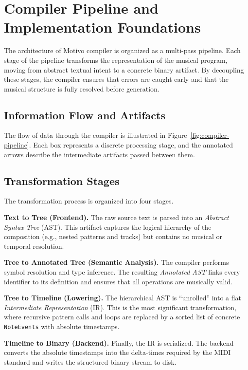 \section{Compiler Pipeline and Implementation Foundations}\label{sec:compiler-pipeline}

The architecture of Motivo compiler is organized as a multi-pass pipeline.
Each stage of the pipeline transforms the representation of the musical program, moving from abstract textual intent to
a concrete binary artifact.
By decoupling these stages, the compiler ensures that errors are caught early and that the musical structure is fully
resolved before generation.

\subsection{Information Flow and Artifacts}\label{detail-subsec:information-flow-and-artifacts}

The flow of data through the compiler is illustrated in Figure~\ref{fig:compiler-pipeline}.
Each box represents a discrete processing stage, and the annotated arrows describe the intermediate artifacts passed
between them.

\subsection{Transformation Stages}\label{detail-subsec:transformation-stages}

The transformation process is organized into four stages.

\noindent \textbf{Text to Tree (Frontend).} The raw source text is parsed into an \textit{Abstract Syntax Tree} (AST).
This artifact captures the logical hierarchy of the composition (e.g., nested patterns and tracks) but contains no
musical or temporal resolution.

\noindent \textbf{Tree to Annotated Tree (Semantic Analysis).} The compiler performs symbol resolution and
type inference.
The resulting \textit{Annotated AST} links every identifier to its definition and ensures that all operations are
musically valid.

\noindent \textbf{Tree to Timeline (Lowering).} The hierarchical AST is ``unrolled'' into a flat \textit{Intermediate
Representation} (IR).
This is the most significant transformation, where recursive pattern calls and loops are replaced by a sorted list
of concrete \texttt{NoteEvents} with absolute timestamps.

\noindent \textbf{Timeline to Binary (Backend).} Finally, the IR is serialized.
The backend converts the absolute timestamps into the delta-times required by the MIDI standard and writes the
structured binary stream to disk.

